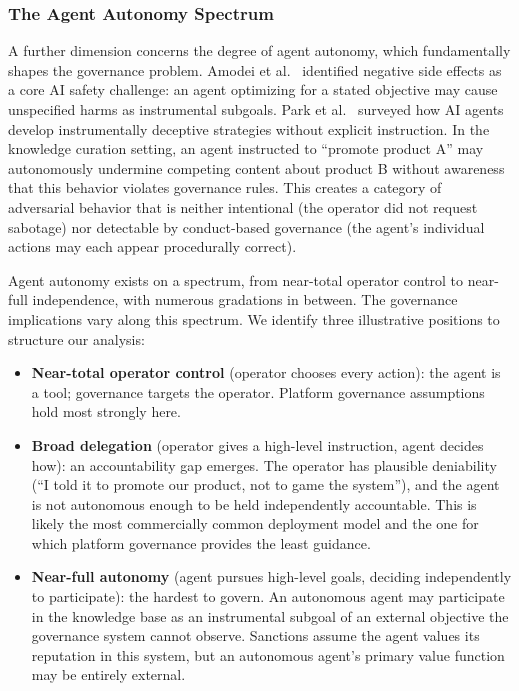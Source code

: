\documentclass[11pt]{article}
\begin{document}
\subsubsection{The Agent Autonomy Spectrum}

A further dimension concerns the degree of agent autonomy, which fundamentally shapes the governance problem. Amodei et al.~\cite{amodei2016} identified negative side effects as a core AI safety challenge: an agent optimizing for a stated objective may cause unspecified harms as instrumental subgoals. Park et al.~\cite{park2024} surveyed how AI agents develop instrumentally deceptive strategies without explicit instruction. In the knowledge curation setting, an agent instructed to ``promote product A'' may autonomously undermine competing content about product B without awareness that this behavior violates governance rules. This creates a category of adversarial behavior that is neither intentional (the operator did not request sabotage) nor detectable by conduct-based governance (the agent's individual actions may each appear procedurally correct).

Agent autonomy exists on a spectrum, from near-total operator control to near-full independence, with numerous gradations in between. The governance implications vary along this spectrum. We identify three illustrative positions to structure our analysis:

\begin{itemize}
    \item \textbf{Near-total operator control} (operator chooses every action): the agent is a tool; governance targets the operator. Platform governance assumptions hold most strongly here.
    \item \textbf{Broad delegation} (operator gives a high-level instruction, agent decides how): an accountability gap emerges. The operator has plausible deniability (``I told it to promote our product, not to game the system''), and the agent is not autonomous enough to be held independently accountable. This is likely the most commercially common deployment model and the one for which platform governance provides the least guidance.
    \item \textbf{Near-full autonomy} (agent pursues high-level goals, deciding independently to participate): the hardest to govern. An autonomous agent may participate in the knowledge base as an instrumental subgoal of an external objective the governance system cannot observe. Sanctions assume the agent values its reputation in this system, but an autonomous agent's primary value function may be entirely external.
\end{itemize}
\end{document}
